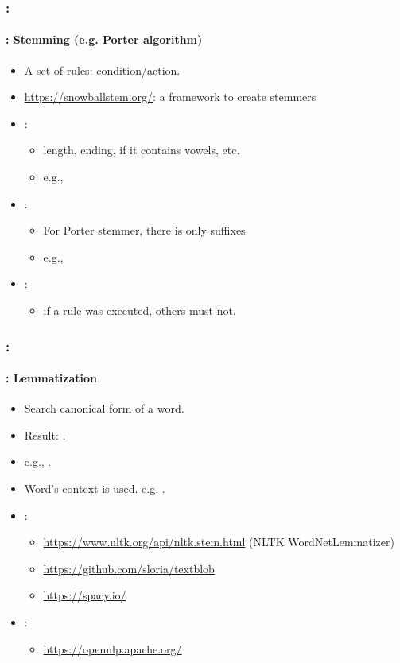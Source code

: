 \documentclass[xcolor=table]{beamer}
\begin{document}
\begin{frame}
	\frametitle{\insertshortsubtitle: \insertsection}
	\framesubtitle{\insertsubsection: Stemming (e.g. Porter algorithm)}

	\begin{itemize}
		\item A set of rules: condition/action.
		\item \url{https://snowballstem.org/}: a framework to create stemmers
		\item {}:
		\begin{itemize}
			\item length, ending, if it contains vowels, etc.
			\item e.g., 
		\end{itemize}
		\item {}:
		\begin{itemize}
			\item For Porter stemmer, there is only suffixes 
			\item e.g., 
		\end{itemize}
		\item {}:
		\begin{itemize}
			\item if a rule was executed, others must not.
		\end{itemize}
	\end{itemize}

\end{frame}

\begin{frame}
	\frametitle{\insertshortsubtitle: \insertsection}
	\framesubtitle{\insertsubsection: Lemmatization}

	\begin{itemize}
		\item Search canonical form of a word.
		\item Result: .
		\item e.g., .
		\item Word's context is used. e.g. .
		\item {}:
		\begin{itemize}
			\item \url{https://www.nltk.org/api/nltk.stem.html} (NLTK WordNetLemmatizer)
			\item \url{https://github.com/sloria/textblob}
			\item \url{https://spacy.io/}
		\end{itemize}
		\item {}:
		\begin{itemize}
			\item \url{https://opennlp.apache.org/}
		\end{itemize}
	\end{itemize}

\end{frame}
\end{document}
